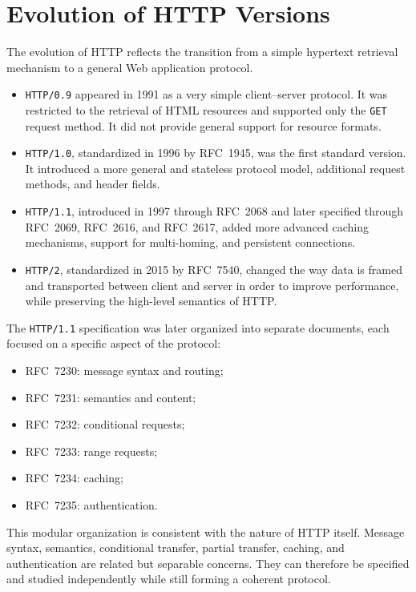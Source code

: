 \documentclass{scrbook}
\begin{document}
\section{Evolution of HTTP Versions}

The evolution of HTTP reflects the transition from a simple hypertext retrieval mechanism to a general Web application protocol.

\begin{itemize}
    \item \texttt{HTTP/0.9} appeared in 1991 as a very simple client--server protocol. It was restricted to the retrieval of HTML resources and supported only the \texttt{GET} request method. It did not provide general support for resource formats.
    \item \texttt{HTTP/1.0}, standardized in 1996 by RFC~1945, was the first standard version. It introduced a more general and stateless protocol model, additional request methods, and header fields.
    \item \texttt{HTTP/1.1}, introduced in 1997 through RFC~2068 and later specified through RFC~2069, RFC~2616, and RFC~2617, added more advanced caching mechanisms, support for multi-homing, and persistent connections.
    \item \texttt{HTTP/2}, standardized in 2015 by RFC~7540, changed the way data is framed and transported between client and server in order to improve performance, while preserving the high-level semantics of HTTP.
\end{itemize}

The \texttt{HTTP/1.1} specification was later organized into separate documents, each focused on a specific aspect of the protocol:
\begin{itemize}
    \item RFC~7230: message syntax and routing;
    \item RFC~7231: semantics and content;
    \item RFC~7232: conditional requests;
    \item RFC~7233: range requests;
    \item RFC~7234: caching;
    \item RFC~7235: authentication.
\end{itemize}

This modular organization is consistent with the nature of HTTP itself. Message syntax, semantics, conditional transfer, partial transfer, caching, and authentication are related but separable concerns. They can therefore be specified and studied independently while still forming a coherent protocol.
\end{document}
